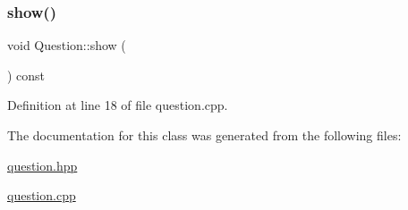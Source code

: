 \mbox{\label{class_question_a1680a8dfef011dcf971b56ab302b3164}} 
\subsubsection{\texorpdfstring{show()}{show()}}
{\footnotesize\ttfamily void Question\+::show (\begin{DoxyParamCaption}{ }\end{DoxyParamCaption}) const}



Definition at line 18 of file question.\+cpp.



The documentation for this class was generated from the following files\+:\begin{DoxyCompactItemize}
\item 
\hyperlink{question_8hpp}{question.\+hpp}\item 
\hyperlink{question_8cpp}{question.\+cpp}\end{DoxyCompactItemize}
